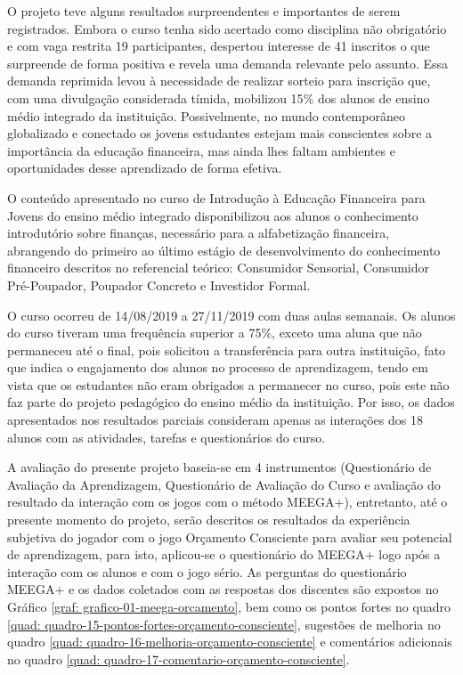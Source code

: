 O projeto teve alguns resultados surpreendentes e importantes de serem registrados. Embora o curso tenha sido acertado como disciplina não obrigatório e com vaga restrita 19 participantes, despertou interesse de 41 inscritos o que surpreende de forma positiva e revela uma demanda relevante pelo assunto. Essa demanda reprimida levou à necessidade de realizar sorteio para inscrição que, com uma divulgação considerada tímida, mobilizou 15{\%} dos alunos de ensino médio integrado da instituição. Possivelmente, no mundo contemporâneo globalizado e conectado os jovens estudantes estejam mais conscientes sobre a importância da educação financeira, mas ainda lhes faltam ambientes e oportunidades desse aprendizado de forma efetiva.

O conteúdo apresentado no curso de Introdução à Educação Financeira para Jovens do ensino médio integrado disponibilizou aos alunos o conhecimento introdutório sobre finanças, necessário para a alfabetização financeira, abrangendo do primeiro ao último estágio de desenvolvimento do conhecimento financeiro descritos no referencial teórico: Consumidor Sensorial, Consumidor Pré-Poupador, Poupador Concreto e Investidor Formal.

O curso ocorreu de 14/08/2019 a 27/11/2019 com duas aulas semanais. Os alunos do curso tiveram uma frequência superior a 75{\%}, exceto uma aluna que não permaneceu até o final, pois solicitou a transferência para outra instituição, fato que indica o engajamento dos alunos no processo de aprendizagem, tendo em vista que os estudantes não eram obrigados a permanecer no curso, pois este não faz parte do projeto pedagógico do ensino médio da instituição. Por isso, os dados apresentados nos resultados parciais consideram apenas as interações dos 18 alunos com as atividades, tarefas e questionários do curso.

A avaliação do presente projeto baseia-se em 4 instrumentos (Questionário de Avaliação da Aprendizagem, Questionário de Avaliação do Curso e avaliação do resultado da interação com os jogos com o método MEEGA+), entretanto, até o presente momento do projeto, serão descritos os resultados da experiência subjetiva do jogador com o jogo Orçamento Consciente para avaliar seu potencial de aprendizagem, para isto, aplicou-se o questionário do MEEGA+ logo após a interação com os alunos e com o jogo sério. As perguntas do questionário MEEGA+ e os dados coletados com as respostas dos discentes são expostos no Gráfico \ref{graf: grafico-01-meega-orcamento}, bem como os pontos fortes no quadro \ref{quad: quadro-15-pontos-fortes-orçamento-consciente}, sugestões de melhoria no quadro \ref{quad: quadro-16-melhoria-orçamento-consciente} e comentários adicionais no quadro \ref{quad: quadro-17-comentario-orçamento-consciente}.

